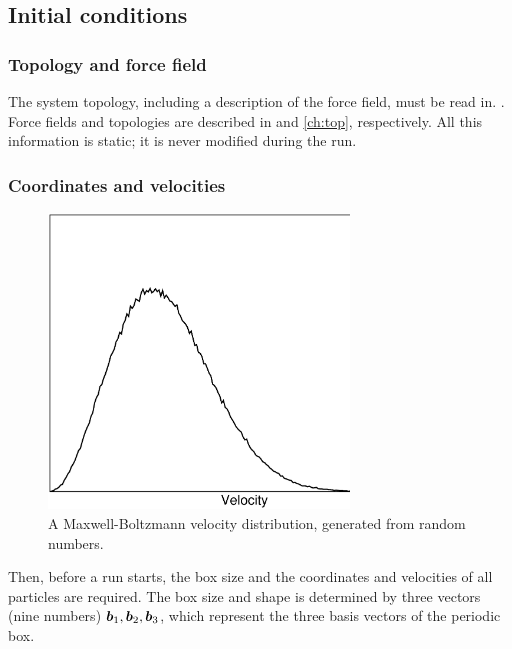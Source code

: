 \subsection{Initial conditions}
\subsubsection{Topology and force field}
The system topology, including a description of the force field, must
be read in.
{.}
{Force fields and topologies are described in 
and \ref{ch:top}, respectively.}
All this information is static; it is never modified during the run.

\subsubsection{Coordinates and velocities}
\begin{figure}
\centerline{\includegraphics[width=8cm]{plots/maxwell}}
\caption{A Maxwell-Boltzmann velocity distribution, generated from 
    random numbers.}
\label{fig:maxwell}
\end{figure}

Then, before a run starts, the box size and the coordinates and
velocities of  all particles are required. The box size and shape is 
determined by three vectors (nine numbers) $\mbox{\boldmath ${b}$}_1, \mbox{\boldmath ${b}$}_2, \mbox{\boldmath ${b}$}_3$, 
which represent the three basis vectors of the periodic box.

